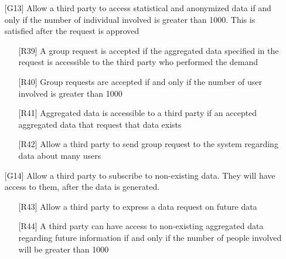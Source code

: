 \begin{itemize}
\begin{itemize}
	\end{itemize}
\item[{[G13]}] Allow a third party to access statistical and anonymized data if and only if the number of individual involved is greater than 1000. This is satisfied after the request is approved  
	\begin{itemize}
	\item[{[R39]}] A group request is accepted if the aggregated data specified in the request is accessible to the third party who performed the demand
	\item[{[R40]}] Group requests are accepted if and only if the number of user involved is greater than 1000
	\item[{[R41]}] Aggregated data is accessible to a third party if an accepted aggregated data that request that data exists
	\item[{[R42]}] Allow a third party to send group request to the system regarding data about many users
	\end{itemize}
\item[{[G14]}] Allow a third party to subscribe to non-existing data. They will have access to them, after the data is generated. 
	\begin{itemize}
	\item[{[R43]}] Allow a third party to express a data request on future data
	\item[{[R44]}] A third party can have access to non-existing aggregated data regarding future information if and only if the number of people involved will be greater than 1000
	\end{itemize}
\end{itemize}



